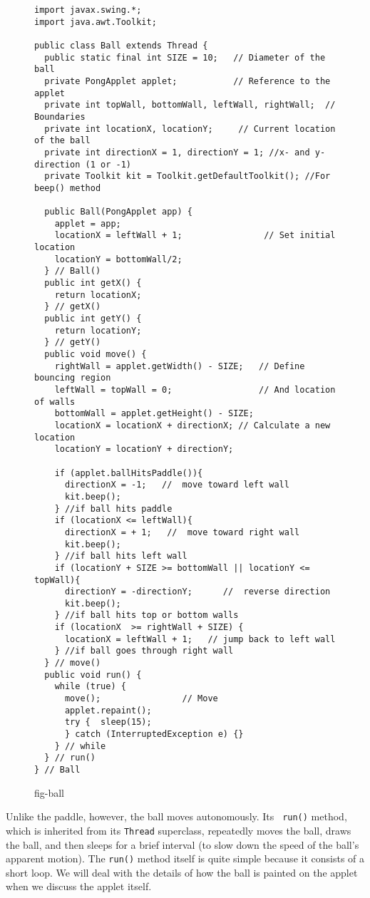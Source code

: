\begin{figure}[p]
\jjjprogstart
\begin{jjjlisting}[34.5pc]
\begin{lstlisting}
import javax.swing.*;
import java.awt.Toolkit;

public class Ball extends Thread {
  public static final int SIZE = 10;   // Diameter of the ball
  private PongApplet applet;           // Reference to the applet
  private int topWall, bottomWall, leftWall, rightWall;  // Boundaries
  private int locationX, locationY;     // Current location of the ball
  private int directionX = 1, directionY = 1; //x- and y-direction (1 or -1)
  private Toolkit kit = Toolkit.getDefaultToolkit(); //For beep() method

  public Ball(PongApplet app) {
    applet = app;
    locationX = leftWall + 1;                // Set initial location
    locationY = bottomWall/2;
  } // Ball()
  public int getX() {
    return locationX;
  } // getX()
  public int getY() {
    return locationY;
  } // getY()
  public void move() {
    rightWall = applet.getWidth() - SIZE;   // Define bouncing region
    leftWall = topWall = 0;                 // And location of walls
    bottomWall = applet.getHeight() - SIZE;
    locationX = locationX + directionX; // Calculate a new location
    locationY = locationY + directionY;

    if (applet.ballHitsPaddle()){
      directionX = -1;   //  move toward left wall
      kit.beep();
    } //if ball hits paddle
    if (locationX <= leftWall){
      directionX = + 1;   //  move toward right wall
      kit.beep();
    } //if ball hits left wall
    if (locationY + SIZE >= bottomWall || locationY <= topWall){
      directionY = -directionY;      //  reverse direction
      kit.beep();
    } //if ball hits top or bottom walls
    if (locationX  >= rightWall + SIZE) {
      locationX = leftWall + 1;   // jump back to left wall
    } //if ball goes through right wall
  } // move()
  public void run() {
    while (true) {
      move();                // Move
      applet.repaint();
      try {  sleep(15);
      } catch (InterruptedException e) {}
    } // while
  } // run()
} // Ball
\end{lstlisting}
\end{jjjlisting}
{fig-ball}
\end{figure}

Unlike the paddle, however, the ball moves autonomously.  Its {\tt
run()} method, which is inherited from its {\tt Thread} superclass,
repeatedly moves the ball, draws the ball, and then sleeps for a brief
interval (to slow down the speed of the ball's apparent motion).  The
{\tt run()} method itself is quite simple because it consists of a
short loop.  We will deal with the details of how the ball is painted
on the applet when we discuss the applet itself.

